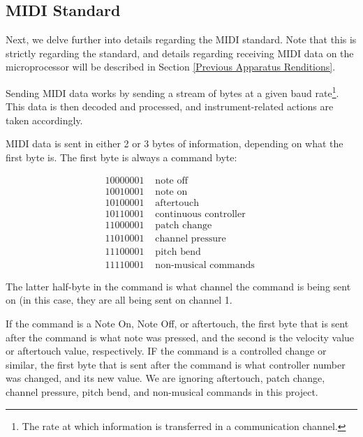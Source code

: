 \documentclass[10pt]{article}
\begin{document}
\subsection{MIDI Standard}\label{MIDI Standard Theory}

Next, we delve further into details regarding the MIDI standard. Note that this is strictly regarding the standard, and details regarding receiving MIDI data on the microprocessor will be described in Section \ref{Previous Apparatus Renditions}. 

Sending MIDI data works by sending a stream of bytes at a given baud rate\footnote{The rate at which information is transferred in a communication channel.}. %
This data is then decoded and processed, and instrument-related actions are taken accordingly. 

MIDI data is sent in either 2 or 3 bytes of information, depending on what the first byte is. The first byte is always a command byte:

$$
\begin{array}{l|l}
10000001 & \text { note off } \\
10010001 & \text { note on } \\
10100001 & \text { aftertouch } \\
10110001 & \text { continuous controller } \\
11000001 & \text { patch change } \\
11010001 & \text { channel pressure } \\
11100001 & \text { pitch bend } \\
11110001 & \text { non-musical commands }
\end{array}
$$

The latter half-byte in the command is what channel the command is being sent on (in this case, they are all being sent on channel 1. 

If the command is a Note On, Note Off, or aftertouch, the first byte that is sent after the command is what note was pressed, and the second is the velocity value or aftertouch value, respectively. IF the command is a controlled change or similar, the first byte that is sent after the command is what controller number was changed, and its new value. We are ignoring aftertouch, patch change, channel pressure, pitch bend, and non-musical commands in this project. 
\end{document}
